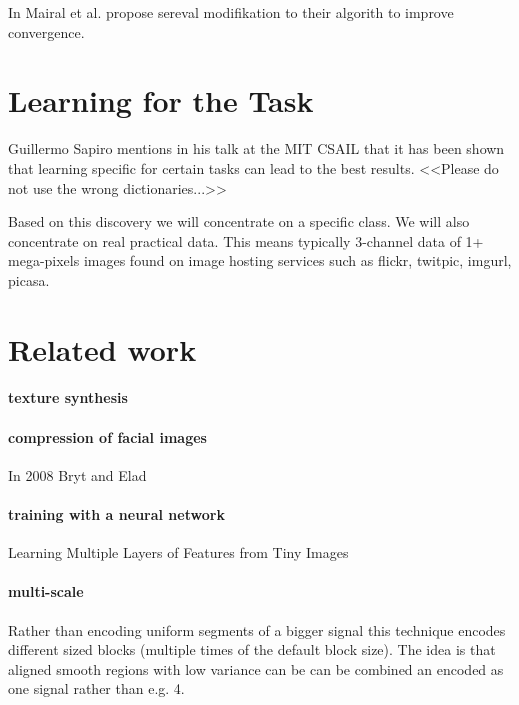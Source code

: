 In \cite{Mairal2010} Mairal et al. propose sereval modifikation to their algorith to improve convergence.



\section{Learning for the Task}
Guillermo Sapiro mentions in his talk \cite{sapiroSlides} at the MIT CSAIL that it has been shown that learning specific for certain tasks can lead to the best results.
<<Please do not use the wrong dictionaries...>>

Based on this discovery we will concentrate on a specific class. 
We will also concentrate on real practical data. This means typically 3-channel data of 1+ mega-pixels images found on image hosting services such as flickr, twitpic, imgurl, picasa.


\section{Related work}




\paragraph{texture synthesis}

\paragraph{compression of facial images}
In 2008 Bryt and Elad \cite{Bryt2008} 

\paragraph{training with a neural network}
Learning Multiple Layers of Features from Tiny Images \cite{Krizhevsky2009}


\paragraph{multi-scale}
Rather than encoding uniform segments of a bigger signal this technique encodes different sized 
blocks (multiple times of the default block size). The idea is that aligned smooth regions with low variance can be 
can be combined an encoded as one signal rather than e.g. 4. \cite{saprioSlides}
\cite{Mairal2007}

